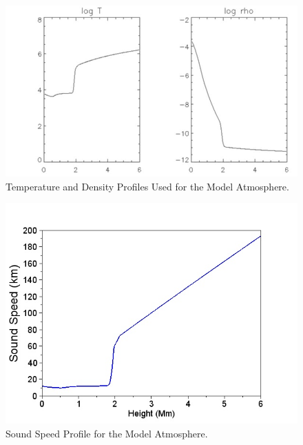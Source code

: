 \documentclass{aa}
\begin{document}

\begin{figure}[h]
\includegraphics[scale=0.7]{images/VAL3C_fig2.jpg}
\caption{Temperature and Density Profiles Used for the Model Atmosphere. }
\end{figure}


\begin{figure}[h]
\includegraphics[scale=0.7]{images/soundspeedVAL3C_profile_fig3.jpeg}
\caption{Sound Speed Profile for the Model Atmosphere. }
\end{figure}
\end{document}
